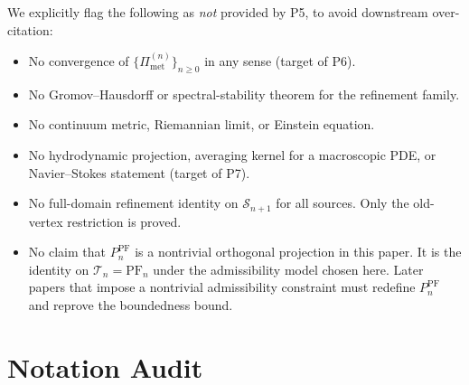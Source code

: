 \documentclass[11pt, a4paper]{amsart}
\theoremstyle{definition}
\newcommand{\Met}{\mathrm{met}}
\newcommand{\PF}{\mathrm{PF}}
\newcommand{\Pimet}{\Pi_{\Met}}
\begin{document}
We explicitly flag the following as \emph{not} provided by P5,
to avoid downstream over-citation:
\begin{itemize}
\item No convergence of $\{\Pimet^{(n)}\}_{n \geq 0}$ in any
  sense (target of P6).
\item No Gromov--Hausdorff or spectral-stability theorem for the
  refinement family.
\item No continuum metric, Riemannian limit, or Einstein
  equation.
\item No hydrodynamic projection, averaging kernel for a
  macroscopic PDE, or Navier--Stokes statement (target of P7).
\item No full-domain refinement identity on $\mathcal S_{n+1}$
  for all sources. Only the old-vertex restriction is proved.
\item No claim that $P_n^\PF$ is a nontrivial orthogonal
  projection in this paper. It is the identity on
  $\mathcal T_n = \PF_n$ under the admissibility model chosen
  here. Later papers that impose a nontrivial admissibility
  constraint must redefine $P_n^\PF$ and reprove the
  boundedness bound.
\end{itemize}

\section{Notation Audit}
\label{sec:notation}
\end{document}
